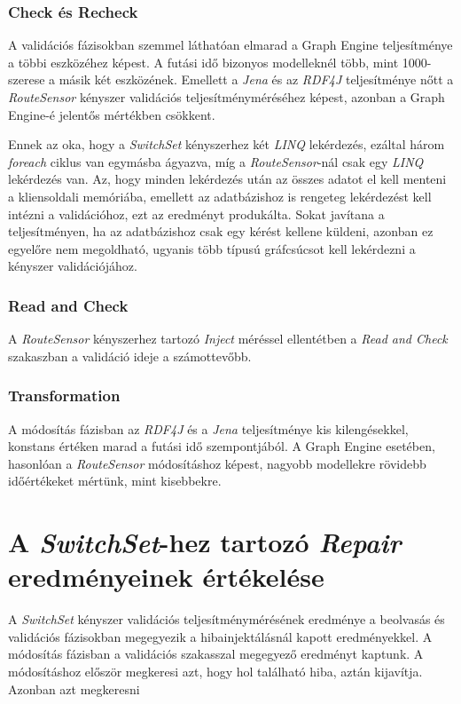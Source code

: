 \subsubsection{Check és Recheck}

A validációs fázisokban szemmel láthatóan elmarad a Graph Engine teljesítménye a többi eszközéhez képest. A futási idő bizonyos modelleknél több, mint 1000-szerese a másik két eszközének. Emellett a \emph{Jena} és az \emph{RDF4J} teljesítménye nőtt a \emph{RouteSensor} kényszer validációs teljesítményméréséhez képest, azonban a Graph Engine-é jelentős mértékben csökkent.

Ennek az oka, hogy a \emph{SwitchSet} kényszerhez két \emph{LINQ} lekérdezés, ezáltal három \emph{foreach} ciklus van egymásba ágyazva, míg a \emph{RouteSensor}-nál csak egy \emph{LINQ} lekérdezés van. Az, hogy minden lekérdezés után az összes adatot el kell menteni a kliensoldali memóriába, emellett az adatbázishoz is rengeteg lekérdezést kell intézni a validációhoz, ezt az eredményt produkálta. Sokat javítana a teljesítményen, ha az adatbázishoz csak egy kérést kellene küldeni, azonban ez egyelőre nem megoldható, ugyanis több típusú gráfcsúcsot kell lekérdezni a kényszer validációjához.

\subsubsection{Read and Check}

A \emph{RouteSensor} kényszerhez tartozó \emph{Inject} méréssel ellentétben a \emph{Read and Check} szakaszban a validáció ideje a számottevőbb.

\subsubsection{Transformation}

A módosítás fázisban az \emph{RDF4J} és a \emph{Jena} teljesítménye kis kilengésekkel, konstans értéken marad a futási idő szempontjából. A Graph Engine esetében, hasonlóan a \emph{RouteSensor} módosításhoz képest, nagyobb modellekre rövidebb időértékeket mértünk, mint kisebbekre.

\section{A \emph{SwitchSet}-hez tartozó \emph{Repair} eredményeinek értékelése}

A \emph{SwitchSet} kényszer validációs teljesítménymérésének eredménye a beolvasás és validációs fázisokban megegyezik a hibainjektálásnál kapott eredményekkel. A módosítás fázisban a validációs szakasszal megegyező eredményt kaptunk. A módosításhoz először megkeresi azt, hogy hol található hiba, aztán kijavítja. Azonban azt megkeresni

